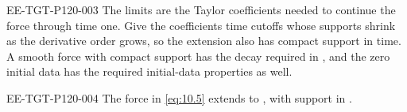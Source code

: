 \begin{EESegment}{EE-TGT-P120-003}
The limits  are the Taylor coefficients needed to continue the force
through time one. Give the coefficients time cutoffs whose supports shrink as the derivative order
grows, so the extension also has compact support in time. A smooth force with compact support has
the decay required in \cite[(5)]{ref-13}, and the zero initial data has the required initial-data
properties as well.
\end{EESegment}

\begin{lemma}\label{lem:10.3}
\begin{EESegment}{EE-TGT-P120-004}
The force in \eqref{eq:10.5} extends to
, with support in
.
\end{EESegment}
\end{lemma}


